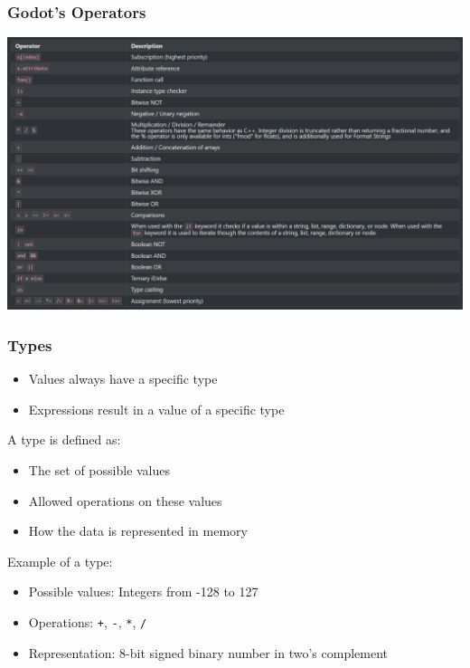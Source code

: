 \documentclass{beamer}
\newenvironment{xframe}[2][]
{
    \begin{frame}[fragile,environment=xframe,#1]
    \frametitle{#2}
}{
    \end{frame}
}
\begin{document}
\begin{xframe}{Godot's Operators}
    \includegraphics[width=\textwidth]{godot-operators}
\end{xframe}

\begin{xframe}{Types}
    \begin{itemize}
        \item Values always have a specific type
        \item Expressions result in a value of a specific type
    \end{itemize}


    \pause
    \medskip

    A type is defined as:
    \begin{itemize}
        \item The set of possible values
        \item Allowed operations on these values
        \item How the data is represented in memory
    \end{itemize}


    \pause
    \medskip

    Example of a type:
    \begin{itemize}
        \item Possible values: Integers from -128 to 127
        \item Operations: \texttt{+}, \texttt{-}, \texttt{*}, \texttt{/}
        \item Representation: 8-bit signed binary number in two's complement
    \end{itemize}

\end{xframe}
\end{document}
